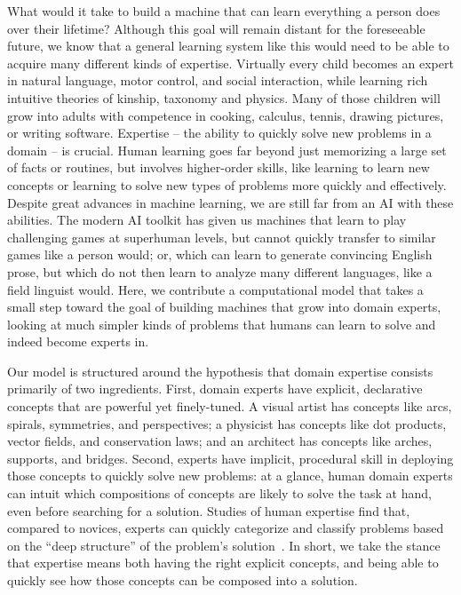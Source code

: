 \documentclass{article}
\begin{document}
What would it take to build a machine that can learn everything a
person does over their lifetime?
Although this goal will remain distant for the foreseeable future,
we know that a general learning system like this would need to be able to acquire many different kinds of expertise.
Virtually every child becomes an expert in natural language, motor control, and social interaction, while learning rich
intuitive theories of kinship, taxonomy and physics. Many of those
children will grow into adults with competence in cooking, calculus, tennis, drawing
pictures, or writing software.
Expertise -- the ability to quickly solve new problems in a domain -- is crucial.
Human learning goes far beyond just memorizing a large set of facts or routines,
but involves higher-order skills,
like learning to learn new concepts or
learning to solve new types of problems more quickly and effectively.
Despite great advances in machine learning,
we are still far from
an AI with these abilities.
The modern AI toolkit has given us machines that learn to play challenging games at superhuman levels,
but cannot quickly transfer to similar games like a person would;
or, which can learn to generate convincing English prose,
but which do not then learn to analyze many different languages,
like a field linguist would.
Here, we contribute a computational model that takes a small step toward the goal of building machines that
grow into domain experts,
looking at much simpler kinds of problems that humans can learn to solve and indeed become experts in.

Our model is structured
around the hypothesis that
domain expertise
consists primarily of two ingredients.
First, domain experts have 
explicit, declarative concepts that are powerful yet finely-tuned.
A visual artist has concepts like arcs, spirals, symmetries, and perspectives;
a physicist has concepts like dot products, vector fields, and conservation laws;
and an architect has concepts like arches, supports, and bridges.
Second, experts have implicit, procedural skill in deploying those concepts
to quickly solve new problems:
at a glance, human domain
experts can intuit which compositions of concepts are likely to solve
the task at hand, even before searching for a solution.
Studies of human expertise
find that,
compared to novices,
experts can quickly categorize and classify problems based on the ``deep structure''
of the problem's solution~\cite{chi1981expertise,chi2012seeing}.
In short, we take the stance that expertise means both
having the right explicit concepts, and being able to quickly see how those concepts can be composed into a solution.
\end{document}
